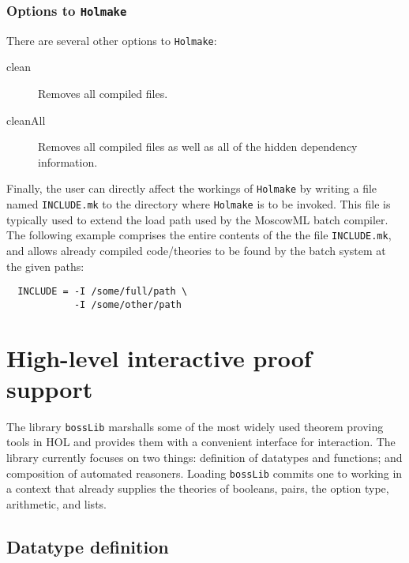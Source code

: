 \subsection{Options to {\tt Holmake}}

There are several other options to {\tt Holmake}:
\begin{description}

\item[clean] Removes all compiled files.

\item [cleanAll] Removes all compiled files as well as all of the hidden
dependency information. 
\end{description}

Finally, the user can directly affect the workings of \verb+Holmake+ by
writing a file named \verb+INCLUDE.mk+ to the directory where
\verb+Holmake+ is to be invoked. This file is typically used to extend
the load path used by the MoscowML batch compiler. The following example
comprises the entire contents of the the file \verb+INCLUDE.mk+, and
allows already compiled code/theories to be found by the batch system
at the given paths:
\begin{verbatim} 
  INCLUDE = -I /some/full/path \ 
            -I /some/other/path
\end{verbatim}

\chapter{High-level interactive proof support}\label{bossLib}

The library \verb+bossLib+ marshalls some of the most widely used
theorem proving tools in HOL and provides them with a convenient
interface for interaction. The library currently focuses on two things:
definition of datatypes and functions; and composition of automated
reasoners. Loading \verb+bossLib+ commits one to working in a context
that already supplies the theories of booleans, pairs, the option type,
arithmetic, and lists.

\section{Datatype definition}

